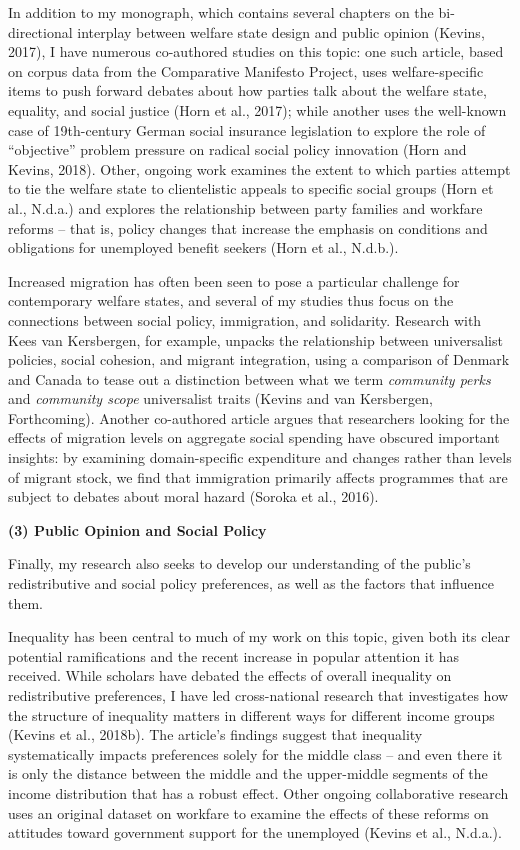 \documentclass[letterpaper]{scrartcl}
\begin{document}
  In addition to my monograph, which contains several chapters on the bi-directional interplay between welfare state design and public opinion (Kevins, 2017), I have numerous co-authored studies on this topic: one such article, based on corpus data from the Comparative Manifesto Project, uses welfare-specific items to push forward debates about how parties talk about the welfare state, equality, and social justice (Horn et al., 2017); while another uses the well-known case of 19th-century German social insurance legislation to explore the role of ``objective'' problem pressure on radical social policy innovation (Horn and Kevins, 2018). Other, ongoing work examines the extent to which parties attempt to tie the welfare state to clientelistic appeals to specific social groups (Horn et al., N.d.a.) and explores the relationship between party families and workfare reforms -- that is, policy changes that increase the emphasis on conditions and obligations for unemployed benefit seekers (Horn et al., N.d.b.).

  Increased migration has often been seen to pose a particular challenge for contemporary welfare states, and several of my studies thus focus on the connections between social policy, immigration, and solidarity. Research with Kees van Kersbergen, for example, unpacks the relationship between universalist policies, social cohesion, and migrant integration, using a comparison of Denmark and Canada to tease out a distinction between what we term \textit{community perks} and \textit{community scope} universalist traits (Kevins and van Kersbergen, Forthcoming). Another co-authored article argues that researchers looking for the effects of migration levels on aggregate social spending have obscured important insights: by examining domain-specific expenditure and changes rather than levels of migrant stock, we find that immigration primarily affects programmes that are subject to debates about moral hazard (Soroka et al., 2016).

  \textbf{(3) Public Opinion and Social Policy}
  \vspace{-1em}

  Finally, my research also seeks to develop our understanding of the public’s redistributive and social policy preferences, as well as the factors that influence them.

  Inequality has been central to much of my work on this topic, given both its clear potential ramifications and the recent increase in popular attention it has received. While scholars have debated the effects of overall inequality on redistributive preferences, I have led cross-national research that investigates how the structure of inequality matters in different ways for different income groups (Kevins et al., 2018b). The article's findings suggest that inequality systematically impacts preferences solely for the middle class – and even there it is only the distance between the middle and the upper-middle segments of the income distribution that has a robust effect. Other ongoing collaborative research uses an original dataset on workfare to examine the effects of these reforms on attitudes toward government support for the unemployed (Kevins et al., N.d.a.).
\end{document}
